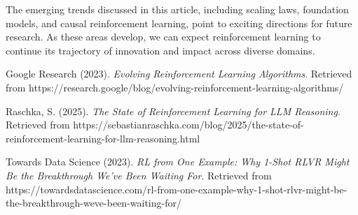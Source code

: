 \documentclass{article}
\begin{document}
The emerging trends discussed in this article, including scaling laws, foundation models, and causal reinforcement learning, point to exciting directions for future research. As these areas develop, we can expect reinforcement learning to continue its trajectory of innovation and impact across diverse domains.

\begin{thebibliography}{9}
Google Research (2023). \textit{Evolving Reinforcement Learning Algorithms}. Retrieved from https://research.google/blog/evolving-reinforcement-learning-algorithms/

Raschka, S. (2025). \textit{The State of Reinforcement Learning for LLM Reasoning}. Retrieved from https://sebastianraschka.com/blog/2025/the-state-of-reinforcement-learning-for-llm-reasoning.html

Towards Data Science (2023). \textit{RL from One Example: Why 1-Shot RLVR Might Be the Breakthrough We've Been Waiting For}. Retrieved from https://towardsdatascience.com/rl-from-one-example-why-1-shot-rlvr-might-be-the-breakthrough-weve-been-waiting-for/
\end{thebibliography}
\end{document}
